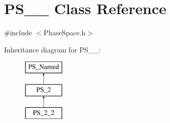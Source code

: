 \hypertarget{classPS__2__2}{}\section{P\+S\+\_\+\_ Class Reference}
\label{classPS__2__2}


{\ttfamily \#include $<$Phase\+Space.\+h$>$}

Inheritance diagram for P\+S\+\_\+\_\+:\begin{figure}[H]
\begin{center}
\leavevmode
\includegraphics[height=3.000000cm]{classPS__2__2}
\end{center}
\end{figure}
